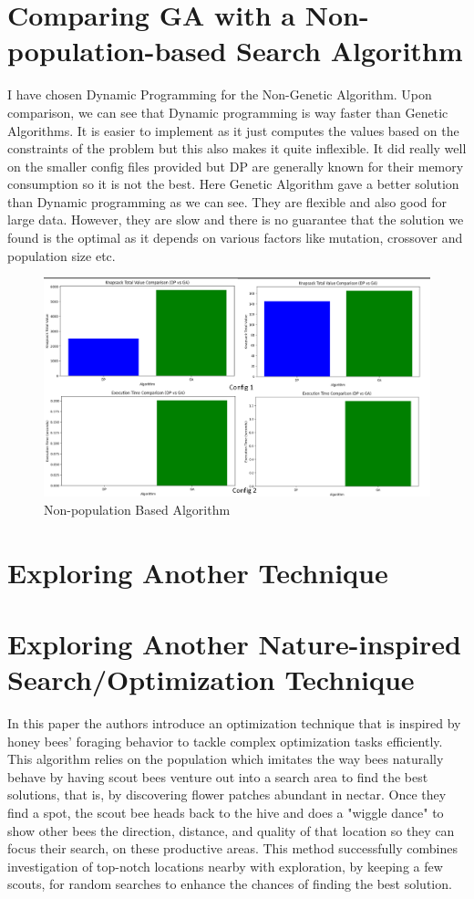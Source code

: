 \documentclass{article}
\begin{document}
\section*{Comparing GA with a Non-population-based Search Algorithm}
	I have chosen Dynamic Programming for the Non-Genetic Algorithm. Upon comparison, we can see that Dynamic programming is way faster than Genetic Algorithms. It is easier to implement as it just computes the values based on the constraints of the problem but this also makes it quite inflexible. It did really well on the smaller config files provided but DP are generally known for their memory consumption so it is not the best. Here Genetic Algorithm gave a better solution than Dynamic programming as we can see. They are flexible and also good for large data. However, they are slow and there is no guarantee that the solution we found is the optimal as it depends on various factors like mutation, crossover and population size etc.
\begin{figure}
    \centering
    \includegraphics[width=1\linewidth]{q5e.png}
    \caption{Non-population Based Algorithm}
    \label{fig:enter-label}
\end{figure}

\section*{Exploring Another Technique}
\section*{Exploring Another Nature-inspired Search/Optimization Technique}
In this paper the authors introduce an optimization technique that is inspired by honey bees' foraging behavior to tackle complex optimization tasks efficiently. This algorithm relies on the population which imitates the way bees naturally behave by having scout bees venture out into a search area to find the best solutions, that is, by discovering flower patches abundant in nectar. Once they find a spot, the scout bee heads back to the hive and does a "wiggle dance" to show other bees the direction, distance, and quality of that location so they can focus their search, on these productive areas. This method successfully combines investigation of top-notch locations nearby with exploration, by keeping a few scouts, for random searches to enhance the chances of finding the best solution. 
\end{document}
